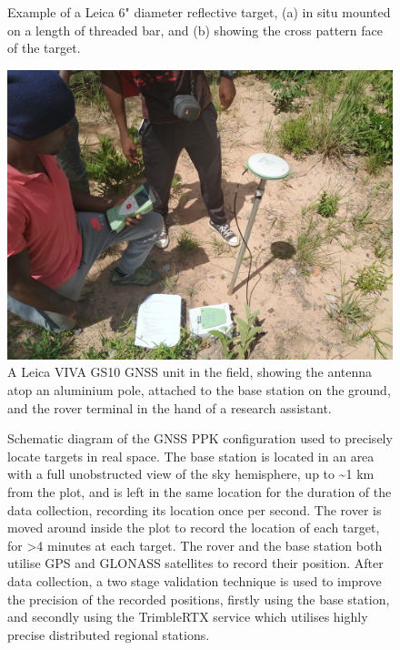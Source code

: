 \documentclass[11pt,a4paper]{article}
\begin{document}
\begin{figure}
\begin{subfigure}{0.45\linewidth}
		\caption{}
		\label{target_face}
	\end{subfigure}
	\caption{Example of a Leica 6" diameter reflective target, (a) in situ mounted on a length of threaded bar, and (b) showing the cross pattern face of the target.}
	\label{target}
\end{figure}

\begin{figure}
	\includegraphics[width=0.6\linewidth]{viva}
	\caption{A Leica VIVA GS10 GNSS unit in the field, showing the antenna atop an aluminium pole, attached to the base station on the ground, and the rover terminal in the hand of a research assistant.}
	\label{viva}
\end{figure}

\begin{figure}
	\caption{Schematic diagram of the GNSS PPK configuration used to precisely locate targets in real space. The base station is located in an area with a full unobstructed view of the sky hemisphere, up to \textasciitilde{}1 km from the plot, and is left in the same location for the duration of the data collection, recording its location once per second. The rover is moved around inside the plot to record the location of each target, for >4 minutes at each target. The rover and the base station both utilise GPS and GLONASS satellites to record their position. After data collection, a two stage validation technique is used to improve the precision of the recorded positions, firstly using the base station, and secondly using the TrimbleRTX service which utilises highly precise distributed regional stations.}
	\label{ppk}
\end{figure}
\end{document}
